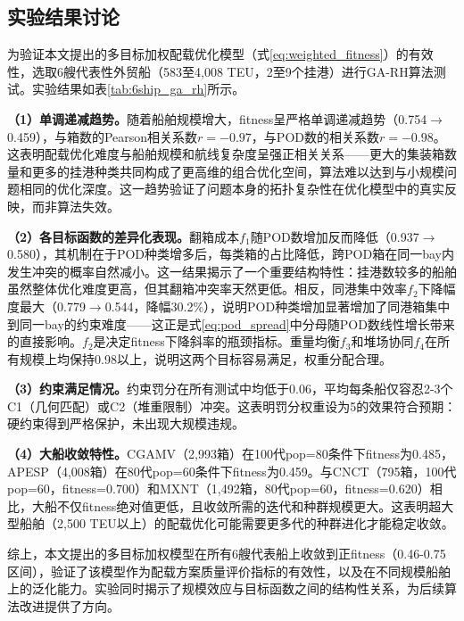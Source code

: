 
\subsection{实验结果讨论}

为验证本文提出的多目标加权配载优化模型（式\ref{eq:weighted_fitness}）的有效性，选取6艘代表性外贸船（583至4,008 TEU，2至9个挂港）进行GA-RH算法测试。实验结果如表\ref{tab:6ship_ga_rh}所示。

\textbf{（1）单调递减趋势。}随着船舶规模增大，fitness呈严格单调递减趋势（0.754$\rightarrow$0.459），与箱数的Pearson相关系数$r=-0.97$，与POD数的相关系数$r=-0.98$。这表明配载优化难度与船舶规模和航线复杂度呈强正相关关系——更大的集装箱数量和更多的挂港种类共同构成了更高维的组合优化空间，算法难以达到与小规模问题相同的优化深度。这一趋势验证了问题本身的拓扑复杂性在优化模型中的真实反映，而非算法失效。

\textbf{（2）各目标函数的差异化表现。}翻箱成本$f_1$随POD数增加反而降低（0.937$\rightarrow$0.580），其机制在于POD种类增多后，每类箱的占比降低，跨POD箱在同一bay内发生冲突的概率自然减小。这一结果揭示了一个重要结构特性：挂港数较多的船舶虽然整体优化难度更高，但其翻箱冲突率天然更低。相反，同港集中效率$f_2$下降幅度最大（0.779$\rightarrow$0.544，降幅30.2\%），说明POD种类增加显著增加了同港箱集中到同一bay的约束难度——这正是式\ref{eq:pod_spread}中分母随POD数线性增长带来的直接影响。$f_2$是决定fitness下降斜率的瓶颈指标。重量均衡$f_3$和堆场协同$f_4$在所有规模上均保持0.98以上，说明这两个目标容易满足，权重分配合理。

\textbf{（3）约束满足情况。}约束罚分在所有测试中均低于0.06，平均每条船仅容忍2-3个C1（几何匹配）或C2（堆重限制）冲突。这表明罚分权重设为5的效果符合预期：硬约束得到严格保护，未出现大规模违规。

\textbf{（4）大船收敛特性。}CGAMV（2,993箱）在100代pop=80条件下fitness为0.485，APESP（4,008箱）在80代pop=60条件下fitness为0.459。与CNCT（795箱，100代pop=60，fitness=0.700）和MXNT（1,492箱，80代pop=60，fitness=0.620）相比，大船不仅fitness绝对值更低，且收敛所需的迭代和种群规模更大。这表明超大型船舶（2,500 TEU以上）的配载优化可能需要更多代的种群进化才能稳定收敛。

综上，本文提出的多目标加权模型在所有6艘代表船上收敛到正fitness（0.46-0.75区间），验证了该模型作为配载方案质量评价指标的有效性，以及在不同规模船舶上的泛化能力。实验同时揭示了规模效应与目标函数之间的结构性关系，为后续算法改进提供了方向。

